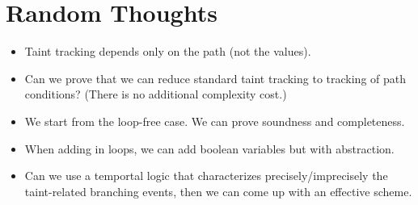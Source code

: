 \documentclass[]{article}
\begin{document}
{\section{Random Thoughts}

\begin{itemize}
	\item Taint tracking depends only on the path (not the values).
	\item Can we prove that we can reduce standard taint tracking to tracking of path conditions? (There is no additional complexity cost.)
	\item We start from the loop-free case. We can prove soundness and completeness.
	\item When adding in loops, we can add boolean variables but with abstraction.
	\item Can we use a temportal logic that characterizes precisely/imprecisely the taint-related branching events, then we can come up with an effective scheme.
\end{itemize}
}
\end{document}
